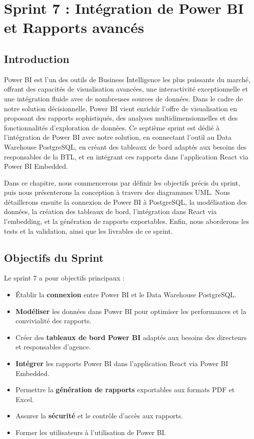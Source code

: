 \chapter{Sprint 7 : Intégration de Power BI et Rapports avancés}
\label{chap:sprint7-powerbi}

\section*{Introduction}

Power BI est l'un des outils de Business Intelligence les plus puissants du marché, offrant des capacités de visualisation avancées, une interactivité exceptionnelle et une intégration fluide avec de nombreuses sources de données. Dans le cadre de notre solution décisionnelle, Power BI vient enrichir l'offre de visualisation en proposant des rapports sophistiqués, des analyses multidimensionnelles et des fonctionnalités d'exploration de données. Ce septième sprint est dédié à l'intégration de Power BI avec notre solution, en connectant l'outil au Data Warehouse PostgreSQL, en créant des tableaux de bord adaptés aux besoins des responsables de la BTL, et en intégrant ces rapports dans l'application React via Power BI Embedded.

Dans ce chapitre, nous commencerons par définir les objectifs précis du sprint, puis nous présenterons la conception à travers des diagrammes UML. Nous détaillerons ensuite la connexion de Power BI à PostgreSQL, la modélisation des données, la création des tableaux de bord, l'intégration dans React via l'embedding, et la génération de rapports exportables. Enfin, nous aborderons les tests et la validation, ainsi que les livrables de ce sprint.

\section{Objectifs du Sprint}
\label{sec:sprint7-objectifs}

Le sprint 7 a pour objectifs principaux :

\begin{itemize}
    \item Établir la \textbf{connexion} entre Power BI et le Data Warehouse PostgreSQL.
    \item \textbf{Modéliser} les données dans Power BI pour optimiser les performances et la convivialité des rapports.
    \item Créer des \textbf{tableaux de bord Power BI} adaptés aux besoins des directeurs et responsables d'agence.
    \item \textbf{Intégrer} les rapports Power BI dans l'application React via Power BI Embedded.
    \item Permettre la \textbf{génération de rapports} exportables aux formats PDF et Excel.
    \item Assurer la \textbf{sécurité} et le contrôle d'accès aux rapports.
    \item Former les utilisateurs à l'utilisation de Power BI.
\end{itemize}

